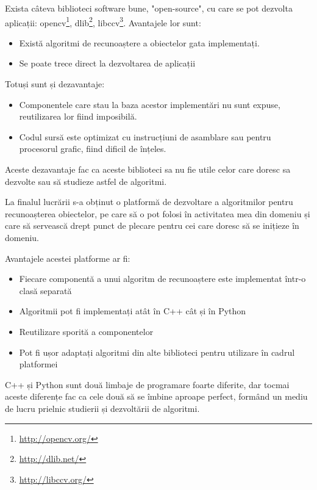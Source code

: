 Exista câteva biblioteci software bune, "open-source", cu care se pot dezvolta aplicații: 
opencv\footnote{\url{http://opencv.org/}}, 
dlib\footnote{\url{http://dlib.net/}}, 
libccv\footnote{\url{http://libccv.org/}}.
Avantajele lor sunt:
\begin{itemize}
	\item Există algoritmi de recunoaștere a obiectelor gata implementați.
	\item Se poate trece direct la dezvoltarea de aplicații
\end{itemize}
Totuși sunt și dezavantaje:
\begin{itemize}
	\item Componentele care stau la baza acestor implementări nu sunt expuse, reutilizarea lor fiind imposibilă.
	\item Codul sursă este optimizat cu instrucțiuni de asamblare sau pentru procesorul grafic, fiind dificil de înțeles.
\end{itemize}
Aceste dezavantaje fac ca aceste biblioteci sa nu fie utile celor care doresc sa dezvolte sau să studieze astfel de algoritmi.

La finalul lucrării s-a obținut o platformă de dezvoltare a algoritmilor pentru recunoașterea obiectelor, pe care să o pot folosi în activitatea mea din domeniu și care să servească drept punct de plecare pentru cei care doresc să se inițieze în domeniu.

Avantajele acestei platforme ar fi:
\begin{itemize}
	\item Fiecare componentă a unui algoritm de recunoaștere este implementat într-o clasă separată
	\item Algoritmii pot fi implementați atât în C++ cât și în Python
	\item Reutilizare sporită a componentelor
	\item Pot fi ușor adaptați algoritmi din alte biblioteci pentru utilizare în cadrul platformei
\end{itemize}

C++ și Python sunt două limbaje de programare foarte diferite, dar tocmai aceste diferențe fac ca cele două să se îmbine aproape perfect, formând un mediu de lucru prielnic studierii și dezvoltării de algoritmi.



